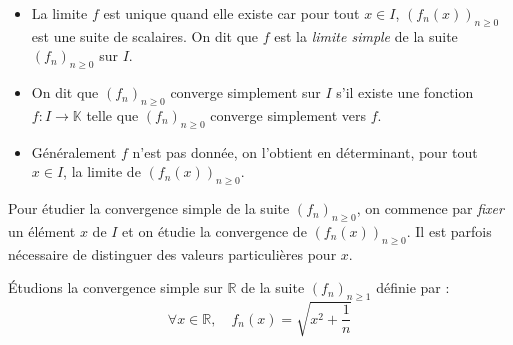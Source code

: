 \documentclass[french,11pt,twoside]{VcCours}
\begin{document}
\begin{Remarques}{}
\begin{itemize} 
\item La limite $f$ est unique quand elle existe car pour tout $x \in I$, $(f_n(x))_{n \geq 0}$ est une suite de scalaires. On dit que $f$ est la \emph{limite simple} de la suite $(f_n)_{n \geq 0}$ sur $I$.
\item On dit que $(f_n)_{n \geq 0}$ converge simplement sur $I$ s'il existe une fonction $f : I \rightarrow \mathbb{K}$ telle que $(f_n)_{n \geq 0}$ converge simplement vers $f$.
\item Généralement $f$ n'est pas donnée, on l'obtient en déterminant, pour tout $x \in I$, la limite de $(f_n(x))_{n \geq 0}$.
\end{itemize}
\end{Remarques}{}

\begin{Methode}{} Pour étudier la convergence simple de la suite $(f_n)_{n \geq 0}$, on commence par \emph{fixer} un élément $x$ de $I$ et on étudie la convergence de $(f_n(x))_{n \geq 0}$. Il est parfois nécessaire de distinguer des valeurs particulières pour $x$.
\end{Methode}

\medskip

\begin{Exemple}[\label{PremierEx}] Étudions la convergence simple sur $\mathbb{R}$ de la suite $(f_n)_{n \geq 1}$ définie par :
$$ \forall x \in \mathbb{R}, \quad f_n(x) = \sqrt{x^2 + \frac{1}{n}}$$

\newpage

\end{Exemple}
\end{document}
